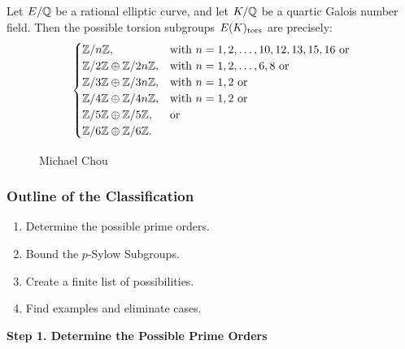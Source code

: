 \begin{frame}[plain]
\small
\begin{thm}[Chou, 2015]
Let $E/\mathbb{Q}$ be a rational elliptic curve, and let $K/\mathbb{Q}$ be a quartic Galois number field. Then the possible torsion subgroups $E(K)_{\text{tors}}$ are precisely:
	\[
	\begin{cases}
	\mathbb{Z}/n\mathbb{Z}, & \text{with } n= 1, 2, \ldots, 10, 12, 13, 15, 16 \text{ or} \\
	\mathbb{Z}/2\mathbb{Z} \oplus \mathbb{Z}/2n\mathbb{Z}, & \text{with } n= 1, 2, \ldots, 6, 8 \text{ or} \\
	\mathbb{Z}/3\mathbb{Z} \oplus \mathbb{Z}/3n\mathbb{Z}, & \text{with } n= 1, 2 \text{ or} \\
	\mathbb{Z}/4\mathbb{Z} \oplus \mathbb{Z}/4n\mathbb{Z}, & \text{with } n= 1, 2 \text{ or} \\
	\mathbb{Z}/5\mathbb{Z} \oplus \mathbb{Z}/5\mathbb{Z}, & \text{or} \\
	\mathbb{Z}/6\mathbb{Z} \oplus \mathbb{Z}/6\mathbb{Z}.
	\end{cases}
	\]
\end{thm}
	\begin{figure}[!ht]
	\centering
	\captionsetup{labelformat=empty}
	\caption{Michael Chou}
	\end{figure}
\end{frame}



\begin{frame}[plain]
\frametitle{Outline of the Classification}
        \begin{enumerate}
        \item Determine the possible prime orders. \vfill
        \item Bound the $p$-Sylow Subgroups. \vfill
        \item Create a finite list of possibilities. \vfill
        \item Find examples and eliminate cases. \vfill
        \end{enumerate}
\vfill
\end{frame}



\begin{frame}[plain]
\vfill
\begin{center} {\bfseries \Large \textcolor{SwarthGarnet}{Step 1. Determine the Possible Prime Orders}} \end{center}
\vfill 
\end{frame}



